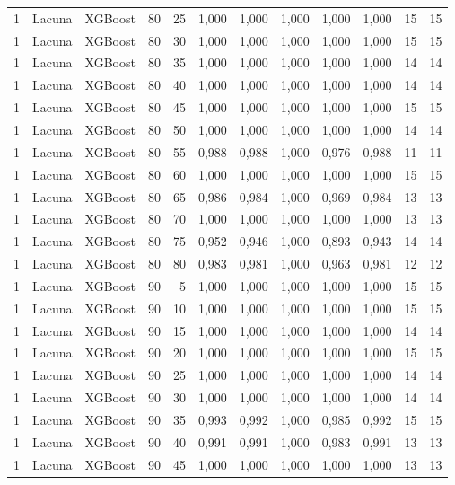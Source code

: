 \begin{longtable}{@{}rllrrrrrrrrr@{}}
1 & Lacuna & XGBoost & 80 & 25 & 1,000 & 1,000 & 1,000 & 1,000 & 1,000 & 15 & 15 \\
1 & Lacuna & XGBoost & 80 & 30 & 1,000 & 1,000 & 1,000 & 1,000 & 1,000 & 15 & 15 \\
1 & Lacuna & XGBoost & 80 & 35 & 1,000 & 1,000 & 1,000 & 1,000 & 1,000 & 14 & 14 \\
1 & Lacuna & XGBoost & 80 & 40 & 1,000 & 1,000 & 1,000 & 1,000 & 1,000 & 14 & 14 \\
1 & Lacuna & XGBoost & 80 & 45 & 1,000 & 1,000 & 1,000 & 1,000 & 1,000 & 15 & 15 \\
1 & Lacuna & XGBoost & 80 & 50 & 1,000 & 1,000 & 1,000 & 1,000 & 1,000 & 14 & 14 \\
1 & Lacuna & XGBoost & 80 & 55 & 0,988 & 0,988 & 1,000 & 0,976 & 0,988 & 11 & 11 \\
1 & Lacuna & XGBoost & 80 & 60 & 1,000 & 1,000 & 1,000 & 1,000 & 1,000 & 15 & 15 \\
1 & Lacuna & XGBoost & 80 & 65 & 0,986 & 0,984 & 1,000 & 0,969 & 0,984 & 13 & 13 \\
1 & Lacuna & XGBoost & 80 & 70 & 1,000 & 1,000 & 1,000 & 1,000 & 1,000 & 13 & 13 \\
1 & Lacuna & XGBoost & 80 & 75 & 0,952 & 0,946 & 1,000 & 0,893 & 0,943 & 14 & 14 \\
1 & Lacuna & XGBoost & 80 & 80 & 0,983 & 0,981 & 1,000 & 0,963 & 0,981 & 12 & 12 \\
1 & Lacuna & XGBoost & 90 & 5 & 1,000 & 1,000 & 1,000 & 1,000 & 1,000 & 15 & 15 \\
1 & Lacuna & XGBoost & 90 & 10 & 1,000 & 1,000 & 1,000 & 1,000 & 1,000 & 15 & 15 \\
1 & Lacuna & XGBoost & 90 & 15 & 1,000 & 1,000 & 1,000 & 1,000 & 1,000 & 14 & 14 \\
1 & Lacuna & XGBoost & 90 & 20 & 1,000 & 1,000 & 1,000 & 1,000 & 1,000 & 15 & 15 \\
1 & Lacuna & XGBoost & 90 & 25 & 1,000 & 1,000 & 1,000 & 1,000 & 1,000 & 14 & 14 \\
1 & Lacuna & XGBoost & 90 & 30 & 1,000 & 1,000 & 1,000 & 1,000 & 1,000 & 14 & 14 \\
1 & Lacuna & XGBoost & 90 & 35 & 0,993 & 0,992 & 1,000 & 0,985 & 0,992 & 15 & 15 \\
1 & Lacuna & XGBoost & 90 & 40 & 0,991 & 0,991 & 1,000 & 0,983 & 0,991 & 13 & 13 \\
1 & Lacuna & XGBoost & 90 & 45 & 1,000 & 1,000 & 1,000 & 1,000 & 1,000 & 13 & 13 \\

\end{longtable}
